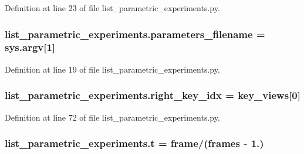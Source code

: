 Definition at line 23 of file list\+\_\+parametric\+\_\+experiments.\+py.

\subsubsection[{\texorpdfstring{parameters\+\_\+filename}{parameters_filename}}]{\setlength{\rightskip}{0pt plus 5cm}list\+\_\+parametric\+\_\+experiments.\+parameters\+\_\+filename = sys.\+argv\mbox{[}1\mbox{]}}\hypertarget{namespacelist__parametric__experiments_aaf67b203e414e9c5207770d5094370aa}{}\label{namespacelist__parametric__experiments_aaf67b203e414e9c5207770d5094370aa}


Definition at line 19 of file list\+\_\+parametric\+\_\+experiments.\+py.

\subsubsection[{\texorpdfstring{right\+\_\+key\+\_\+idx}{right_key_idx}}]{\setlength{\rightskip}{0pt plus 5cm}list\+\_\+parametric\+\_\+experiments.\+right\+\_\+key\+\_\+idx = {\bf key\+\_\+views}\mbox{[}0\mbox{]}}\hypertarget{namespacelist__parametric__experiments_a99d4f4c9465c86a6ee4850358fc45f4a}{}\label{namespacelist__parametric__experiments_a99d4f4c9465c86a6ee4850358fc45f4a}


Definition at line 72 of file list\+\_\+parametric\+\_\+experiments.\+py.

\subsubsection[{\texorpdfstring{t}{t}}]{\setlength{\rightskip}{0pt plus 5cm}list\+\_\+parametric\+\_\+experiments.\+t = frame/({\bf frames} -\/ 1.)}\hypertarget{namespacelist__parametric__experiments_ada91731ac23c09ea7b358830508de2d2}{}\label{namespacelist__parametric__experiments_ada91731ac23c09ea7b358830508de2d2}


